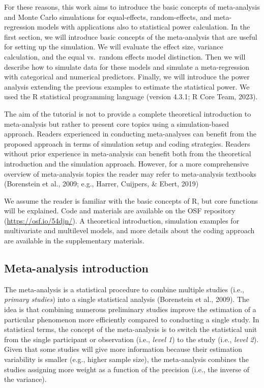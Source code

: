 \documentclass[
  man,floatsintext]{apa6}
\begin{document}
For these reasons, this work aims to introduce the basic concepts of meta-analysis and Monte Carlo simulations for equal-effects, random-effects, and meta-regression models with applications also to statistical power calculation. In the first section, we will introduce basic concepts of the meta-analysis that are useful for setting up the simulation. We will evaluate the effect size, variance calculation, and the equal vs.~random effects model distinction. Then we will describe how to simulate data for these models and simulate a meta-regression with categorical and numerical predictors. Finally, we will introduce the power analysis extending the previous examples to estimate the statistical power. We used the R statistical programming language (version 4.3.1; R Core Team, 2023).

The aim of the tutorial is not to provide a complete theoretical introduction to meta-analysis but rather to present core topics using a simulation-based approach. Readers experienced in conducting meta-analyses can benefit from the proposed approach in terms of simulation setup and coding strategies. Readers without prior experience in meta-analysis can benefit both from the theoretical introduction and the simulation approach. However, for a more comprehensive overview of meta-analysis topics the reader may refer to meta-analysis textbooks (Borenstein et al., 2009; e.g., Harrer, Cuijpers, \& Ebert, 2019)

We assume the reader is familiar with the basic concepts of R, but core functions will be explained. Code and materials are available on the OSF repository (\url{https://osf.io/54djn/}). A theoretical introduction, simulation examples for multivariate and multilevel models, and more details about the coding approach are available in the supplementary materials.

\hypertarget{meta-analysis-introduction}{%
\subsection{Meta-analysis introduction}\label{meta-analysis-introduction}}

The meta-analysis is a statistical procedure to combine multiple studies (i.e., \emph{primary studies}) into a single statistical analysis (Borenstein et al., 2009). The idea is that combining numerous preliminary studies improve the estimation of a particular phenomenon more efficiently compared to conducting a single study. In statistical terms, the concept of the meta-analysis is to switch the statistical unit from the single participant or observation (i.e., \emph{level 1}) to the study (i.e., \emph{level 2}). Given that some studies will give more information because their estimation variability is smaller (e.g., higher sample size), the meta-analysis combines the studies assigning more weight as a function of the precision (i.e., the inverse of the variance).
\end{document}
